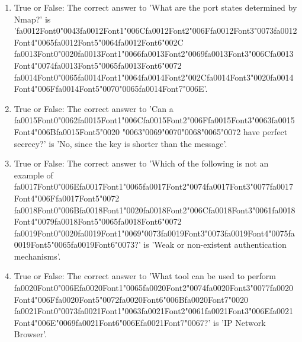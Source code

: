 \documentclass[12pt]{article}
\begin{document}
\begin{enumerate}[label=\arabic*.]
\item True or False: The correct answer to 'What are the port states determined by Nmap?' is '{\csname fa0012Font0\endcsname\char"0043}{\csname fa0012Font1\endcsname\char"006C}{\csname fa0012Font2\endcsname\char"006F}{\csname fa0012Font3\endcsname\char"0073}{\csname fa0012Font4\endcsname\char"0065}{\csname fa0012Font5\endcsname\char"0064}{\csname fa0012Font6\endcsname\char"002C} {\csname fa0013Font0\endcsname\char"0020}{\csname fa0013Font1\endcsname\char"0066}{\csname fa0013Font2\endcsname\char"0069}{\csname fa0013Font3\endcsname\char"006C}{\csname fa0013Font4\endcsname\char"0074}{\csname fa0013Font5\endcsname\char"0065}{\csname fa0013Font6\endcsname\char"0072} {\csname fa0014Font0\endcsname\char"0065}{\csname fa0014Font1\endcsname\char"0064}{\csname fa0014Font2\endcsname\char"002C}{\csname fa0014Font3\endcsname\char"0020}{\csname fa0014Font4\endcsname\char"006F}{\csname fa0014Font5\endcsname\char"0070}{\char"0065}{\csname fa0014Font7\endcsname\char"006E}'.
\item True or False: The correct answer to 'Can a {\csname fa0015Font0\endcsname\char"0062}{\csname fa0015Font1\endcsname\char"006C}{\csname fa0015Font2\endcsname\char"006F}{\csname fa0015Font3\endcsname\char"0063}{\csname fa0015Font4\endcsname\char"006B}{\csname fa0015Font5\endcsname\char"0020} {\char"0063}{\char"0069}{\char"0070}{\char"0068}{\char"0065}{\char"0072} have perfect secrecy?' is 'No, since the key is shorter than the message'.
\item True or False: The correct answer to 'Which of the following is not an example of {\csname fa0017Font0\endcsname\char"006E}{\csname fa0017Font1\endcsname\char"0065}{\csname fa0017Font2\endcsname\char"0074}{\csname fa0017Font3\endcsname\char"0077}{\csname fa0017Font4\endcsname\char"006F}{\csname fa0017Font5\endcsname\char"0072} {\csname fa0018Font0\endcsname\char"006B}{\csname fa0018Font1\endcsname\char"0020}{\csname fa0018Font2\endcsname\char"006C}{\csname fa0018Font3\endcsname\char"0061}{\csname fa0018Font4\endcsname\char"0079}{\csname fa0018Font5\endcsname\char"0065}{\csname fa0018Font6\endcsname\char"0072} {\csname fa0019Font0\endcsname\char"0020}{\csname fa0019Font1\endcsname\char"0069}{\char"0073}{\csname fa0019Font3\endcsname\char"0073}{\csname fa0019Font4\endcsname\char"0075}{\csname fa0019Font5\endcsname\char"0065}{\csname fa0019Font6\endcsname\char"0073}?' is 'Weak or non-existent authentication mechanisms'.
\item True or False: The correct answer to 'What tool can be used to perform {\csname fa0020Font0\endcsname\char"006E}{\csname fa0020Font1\endcsname\char"0065}{\csname fa0020Font2\endcsname\char"0074}{\csname fa0020Font3\endcsname\char"0077}{\csname fa0020Font4\endcsname\char"006F}{\csname fa0020Font5\endcsname\char"0072}{\csname fa0020Font6\endcsname\char"006B}{\csname fa0020Font7\endcsname\char"0020} {\csname fa0021Font0\endcsname\char"0073}{\csname fa0021Font1\endcsname\char"0063}{\csname fa0021Font2\endcsname\char"0061}{\csname fa0021Font3\endcsname\char"006E}{\csname fa0021Font4\endcsname\char"006E}{\char"0069}{\csname fa0021Font6\endcsname\char"006E}{\csname fa0021Font7\endcsname\char"0067}?' is 'IP Network Browser'.

\end{enumerate}
\end{document}
